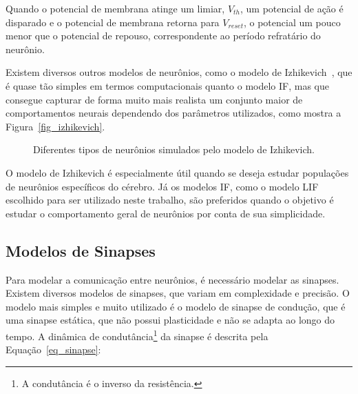 Quando o potencial de membrana atinge um limiar, $V_{th}$, um potencial de ação é disparado e o potencial de membrana retorna
para $V_{reset}$, o potencial um pouco menor que o potencial de repouso, correspondente ao período refratário do neurônio.

Existem diversos outros modelos de neurônios, como o modelo de Izhikevich~\cite{izhikevichSimple2003}, que é quase tão simples em
termos computacionais quanto o modelo IF, mas que consegue capturar de forma muito mais realista um conjunto maior de
comportamentos neurais dependendo dos parâmetros utilizados, como mostra a Figura~\ref{fig_izhikevich}.

\begin{figure}[!ht]
\caption{Diferentes tipos de neurônios simulados pelo modelo de Izhikevich.}
\end{figure}

O modelo de Izhikevich é especialmente útil quando se deseja estudar populações de neurônios específicos do cérebro. Já os modelos
IF, como o modelo LIF escolhido para ser utilizado neste trabalho, são preferidos quando o objetivo é estudar o comportamento
geral de neurônios por conta de sua simplicidade.

\subsection{Modelos de Sinapses}\label{subsection_modelos_sinapses}

Para modelar a comunicação entre neurônios, é necessário modelar as sinapses. Existem diversos modelos de sinapses, que variam em
complexidade e precisão. O modelo mais simples e muito utilizado é o modelo de sinapse de condução, que é uma sinapse estática,
que não possui plasticidade e não se adapta ao longo do tempo. A dinâmica de condutância\footnote{A condutância é o inverso da
resistência.} da sinapse é descrita pela Equação~\ref{eq_sinapse}:

